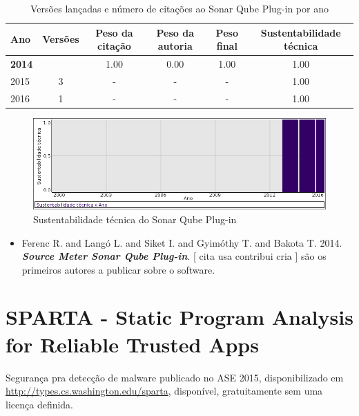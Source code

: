 \begin{table}[H]
\caption{Versões lançadas e número de citações ao Sonar Qube Plug-in por ano}
\centering
\begin{tabular}{| l | c | c | c | c | c |}
  \hline
  Ano & Versões & Peso da citação & Peso da autoria & Peso final & Sustentabilidade técnica \\
  \hline
            {\bf 2014}
          &
          
          &
          1.00
          &
          0.00
          &
          1.00
          &
            {\color{blue} 1.00}
          \\
\hline
        2015 & 3 & - & - & -
        &
          {\color{blue} 1.00}
        \\
\hline
        2016 & 1 & - & - & -
        &
          {\color{blue} 1.00}
        \\
\hline
\end{tabular}
\end{table}

\begin{figure}[h]
  \center
  \includegraphics[scale=0.50]{imagens/softwares-charts/sonarqube-plugin.png}
  \caption{Sustentabilidade técnica do Sonar Qube Plug-in}
\end{figure}


\begin{itemize}
\item Ferenc R. and Langó L. and Siket I. and Gyimóthy T. and Bakota T.
      2014.
        \textbf{\textit{ Source Meter Sonar Qube Plug-in}}.
      [
          cita
          usa
          contribui
          cria
      ]
são os primeiros autores a publicar sobre o software.
\end{itemize}
\section{SPARTA - Static Program Analysis for Reliable Trusted Apps}

Segurança pra detecção de malware
publicado no ASE 2015,
disponibilizado em \url{http://types.cs.washington.edu/sparta},
disponível,
gratuitamente
sem uma licença definida.

